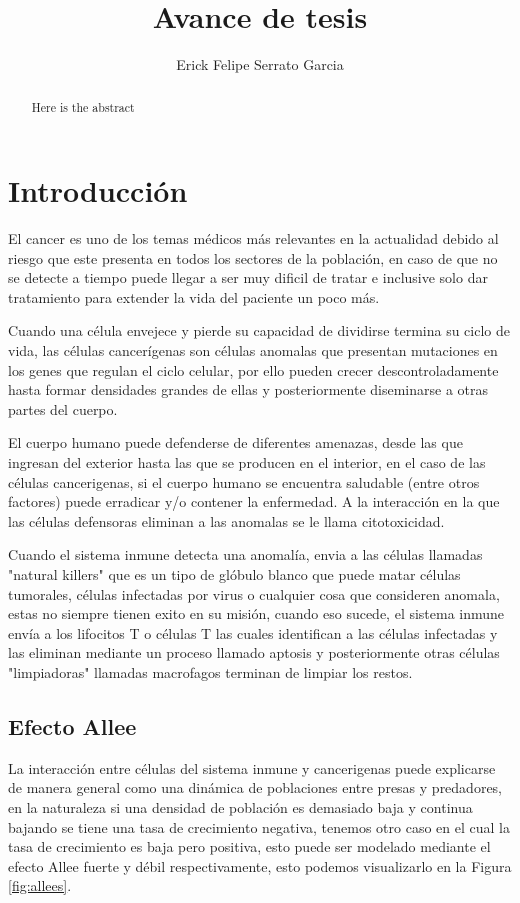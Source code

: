 \documentclass{article}
\title{Avance de tesis}
\author{Erick Felipe Serrato Garcia}
\begin{document}
\maketitle

\begin{abstract}
Here is the abstract
\end{abstract}

\section{Introducción}

El cancer es uno de los temas médicos más relevantes en la actualidad debido al riesgo que este presenta en todos los sectores de la población, en caso de que no se detecte a tiempo puede llegar a ser muy dificil de tratar e inclusive solo dar tratamiento para extender la vida del paciente un poco más.

Cuando una célula envejece y pierde su capacidad de dividirse termina su ciclo de vida, las células cancerígenas son células anomalas que presentan mutaciones en los genes que regulan el ciclo celular, por ello pueden crecer descontroladamente hasta formar densidades grandes de ellas y posteriormente diseminarse a otras partes del cuerpo.

El cuerpo humano puede defenderse de diferentes amenazas, desde las que ingresan del exterior hasta las que se producen en el interior, en el caso de las células cancerigenas, si el cuerpo humano se encuentra saludable (entre otros factores) puede erradicar y/o contener la enfermedad. A la interacción en la que las células defensoras eliminan a las anomalas se le llama citotoxicidad.

Cuando el sistema inmune detecta una anomalía, envia a las células llamadas "natural killers" que es un tipo de glóbulo blanco que puede matar células tumorales, células infectadas por virus o cualquier cosa que consideren anomala, estas no siempre tienen exito en su misión, cuando eso sucede, el sistema inmune envía a los lifocitos T o células T las cuales identifican a las células infectadas y las eliminan mediante un proceso llamado aptosis y posteriormente otras células "limpiadoras" llamadas macrofagos terminan de limpiar los restos.

\subsection{Efecto Allee}

La interacción entre células del sistema inmune y cancerigenas puede explicarse de manera general como una dinámica de poblaciones entre presas y predadores, en la naturaleza si una densidad de población es demasiado baja y continua bajando se tiene una tasa de crecimiento negativa, tenemos otro caso en el cual la tasa de crecimiento es baja pero positiva, esto puede ser modelado mediante el efecto Allee fuerte y débil respectivamente, esto podemos visualizarlo en la Figura \ref{fig:allees}.
\end{document}
